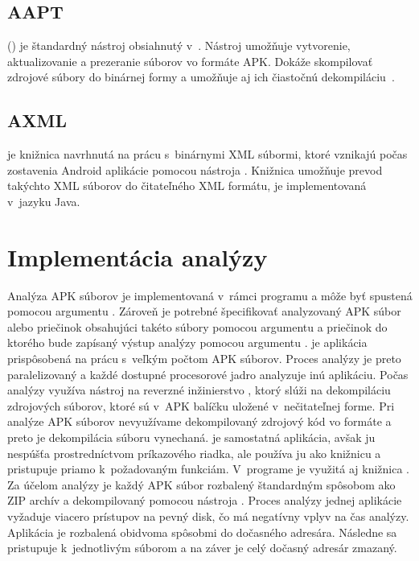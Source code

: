 \subsection{AAPT}
\label{AAPT}

 () je štandardný nástroj obsiahnutý v~. Nástroj  umožňuje vytvorenie, aktualizovanie a prezeranie súborov vo formáte APK. Dokáže skompilovať zdrojové súbory do binárnej formy a umožňuje aj ich čiastočnú dekompiláciu~\cite{aapt}.

\subsection{AXML}
\label{AXML}
 je knižnica navrhnutá na prácu s~binárnymi XML súbormi, ktoré vznikajú počas zostavenia Android aplikácie pomocou nástroja . Knižnica umožňuje prevod takýchto XML súborov do čitateľného XML formátu, je implementovaná v~jazyku Java.

\section{Implementácia analýzy}
Analýza APK súborov je implementovaná v~rámci programu  a môže byť spustená pomocou argumentu . Zároveň je potrebné špecifikovať analyzovaný APK súbor alebo priečinok obsahujúci takéto súbory pomocou argumentu  a priečinok do ktorého bude zapísaný výstup analýzy pomocou argumentu .  je aplikácia prispôsobená na prácu s~veľkým počtom APK súborov. Proces analýzy je preto paralelizovaný a každé dostupné procesorové jadro analyzuje inú aplikáciu. Počas analýzy využíva  nástroj na reverzné inžinierstvo , ktorý slúži na dekompiláciu zdrojových súborov, ktoré sú v~APK balíčku uložené v~nečitateľnej forme. Pri analýze APK súborov nevyužívame dekompilovaný zdrojový kód vo formáte  a preto je dekompilácia súboru  vynechaná.  je samostatná aplikácia, avšak  ju nespúšťa prostredníctvom príkazového riadka, ale používa ju ako knižnicu a pristupuje priamo k~požadovaným funkciám. V~programe je využitá aj knižnica . Za účelom analýzy je každý APK súbor rozbalený štandardným spôsobom ako ZIP archív a dekompilovaný pomocou nástroja . Proces analýzy jednej aplikácie vyžaduje viacero prístupov na pevný disk, čo má negatívny vplyv na čas analýzy. Aplikácia je rozbalená obidvoma spôsobmi do dočasného adresára. Následne sa pristupuje k~jednotlivým súborom a na záver je celý dočasný adresár zmazaný.

